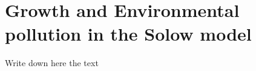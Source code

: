 \section{Growth and Environmental pollution in the Solow model} \label{Sec:env-pollut-Solow}
Write down here the text
